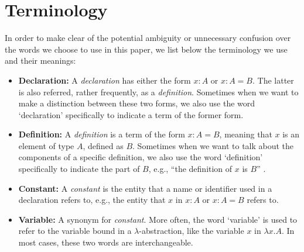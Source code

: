 \chapter{Terminology}
In order to make clear of the potential ambiguity or unnecessary confusion over the words we choose to use in this paper, we list below the terminology we use and their meanings:
\begin{itemize}
  \item \textbf{Declaration:} A \emph{declaration} has either the form $x : A$ or $x : A = B$. The latter is also referred, rather frequently, as a \emph{definition}. Sometimes when we want to make a distinction between these two forms, we also use the word `declaration' specifically to indicate a term of the former form. 
  \item \textbf{Definition:} A \emph{definition} is a term of the form $x : A = B$, meaning that $x$ is an element of type $A$, defined as $B$. Sometimes when we want to talk about the components of a specific definition, we also use the word `definition' specifically to indicate the part of $B$, e.g., ``the definition of $x$ is $B$'' .  
  \item \textbf{Constant:} A \emph{constant} is the entity that a name or identifier used in a declaration refers to, e.g., the entity that $x$ in $x : A$ or $x : A = B$ refers to.
  \item \textbf{Variable:} A synonym for \emph{constant}. More often, the word `variable' is used to refer to the variable bound in a $\lambda$-abstraction, like the variable $x$ in $\lambda x . A$. In most cases, these two words are interchangeable. 
\end{itemize}
